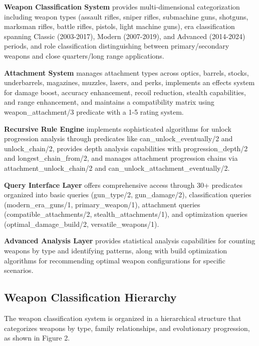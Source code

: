 \documentclass[12pt,a4paper]{article}
\begin{document}
\textbf{Weapon Classification System} provides multi-dimensional categorization including weapon types (assault rifles, sniper rifles, submachine guns, shotguns, marksman rifles, battle rifles, pistols, light machine guns), era classification spanning Classic (2003-2017), Modern (2007-2019), and Advanced (2014-2024) periods, and role classification distinguishing between primary/secondary weapons and close quarters/long range applications.

\textbf{Attachment System} manages attachment types across optics, barrels, stocks, underbarrels, magazines, muzzles, lasers, and perks, implements an effects system for damage boost, accuracy enhancement, recoil reduction, stealth capabilities, and range enhancement, and maintains a compatibility matrix using weapon\_attachment/3 predicate with a 1-5 rating system.

\textbf{Recursive Rule Engine} implements sophisticated algorithms for unlock progression analysis through predicates like can\_unlock\_eventually/2 and unlock\_chain/2, provides depth analysis capabilities with progression\_depth/2 and longest\_chain\_from/2, and manages attachment progression chains via attachment\_unlock\_chain/2 and can\_unlock\_attachment\_eventually/2.

\textbf{Query Interface Layer} offers comprehensive access through 30+ predicates organized into basic queries (gun\_type/2, gun\_damage/2), classification queries (modern\_era\_guns/1, primary\_weapon/1), attachment queries (compatible\_attachments/2, stealth\_attachments/1), and optimization queries (optimal\_damage\_build/2, versatile\_weapons/1).

\textbf{Advanced Analysis Layer} provides statistical analysis capabilities for counting weapons by type and identifying patterns, along with build optimization algorithms for recommending optimal weapon configurations for specific scenarios.

\subsection{Weapon Classification Hierarchy}

The weapon classification system is organized in a hierarchical structure that categorizes weapons by type, family relationships, and evolutionary progression, as shown in Figure 2.
\end{document}
